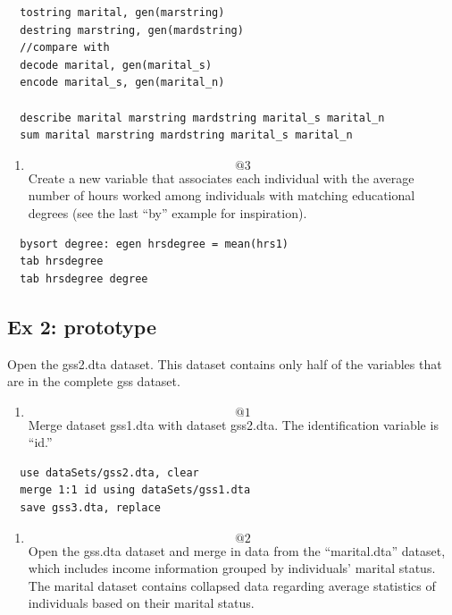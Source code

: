 \documentclass[]{book}
\providecommand{\tightlist}{%
  \setlength{\itemsep}{0pt}\setlength{\parskip}{0pt}}
\begin{document}
\begin{verbatim}
  tostring marital, gen(marstring)
  destring marstring, gen(mardstring)
  //compare with
  decode marital, gen(marital_s)
  encode marital_s, gen(marital_n)

  describe marital marstring mardstring marital_s marital_n
  sum marital marstring mardstring marital_s marital_n
\end{verbatim}

\begin{enumerate}
\def\labelenumi{\arabic{enumi}.}
\setcounter{enumi}{2}
\tightlist
\item
  \[@3\] Create a new variable that associates each individual with the
  average number of hours worked among individuals with matching
  educational degrees (see the last ``by'' example for inspiration).
\end{enumerate}

\begin{verbatim}
  bysort degree: egen hrsdegree = mean(hrs1)
  tab hrsdegree
  tab hrsdegree degree 
\end{verbatim}

\subsection{Ex 2: prototype}\label{ex-2-prototype-3}

Open the gss2.dta dataset. This dataset contains only half of the
variables that are in the complete gss dataset.

\begin{enumerate}
\def\labelenumi{\arabic{enumi}.}
\tightlist
\item
  \[@1\] Merge dataset gss1.dta with dataset gss2.dta. The
  identification variable is ``id.''
\end{enumerate}

\begin{verbatim}
  use dataSets/gss2.dta, clear
  merge 1:1 id using dataSets/gss1.dta
  save gss3.dta, replace
\end{verbatim}

\begin{enumerate}
\def\labelenumi{\arabic{enumi}.}
\setcounter{enumi}{1}
\tightlist
\item
  \[@2\] Open the gss.dta dataset and merge in data from the
  ``marital.dta'' dataset, which includes income information grouped by
  individuals' marital status. The marital dataset contains collapsed
  data regarding average statistics of individuals based on their
  marital status.
\end{enumerate}
\end{document}
